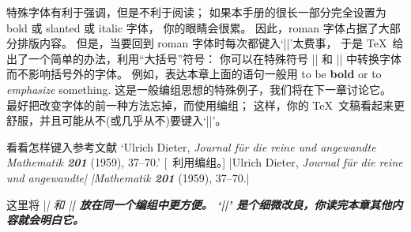 特殊字体有利于强调，但是不利于阅读；
如果本手册的很长一部分完全设置为 bold 或 slanted 或 italic 字体，
你的眼睛会很累。%
因此，roman 字体占据了大部分排版内容。%
但是，当要回到 roman 字体时每次都键入`|\rm|'太费事，
于是 \TeX\ 给出了一个简单的办法，利用``大括号''符号：
你可以在特殊符号 |{| 和 |}| 中转换字体而不影响括号外的字体。%
例如，表达本章上面的语句一般用
\begintt
to be {\bf bold} or to {\sl emphasize} something.
\endtt
这是一般编组思想的特殊例子，我们将在下一章讨论它。%
最好把改变字体的前一种方法忘掉，而使用编组；
\1这样，你的 \TeX\ 文稿看起来更舒服，并且可能从不(或几乎从不)要键入`|\rm|'。

\exercise 看看怎样键入参考文献%
`Ulrich {Dieter},
{\sl Journal f\"ur die reine und angewandte Mathematik\/ \bf201} (1959),
37--70.' [\ 利用编组。]
\answer |Ulrich Dieter, {\sl Journal f\"ur die reine und angewandte|\parbreak
        |Mathematik\/ \bf201} (1959), 37--70.|\par\nobreak\smallskip\noindent
这里将 |\sl| 和 |\bf| 放在同一个编组中更方便。
`|\/|' 是个细微改良，你读完本章其他内容就会明白它。

